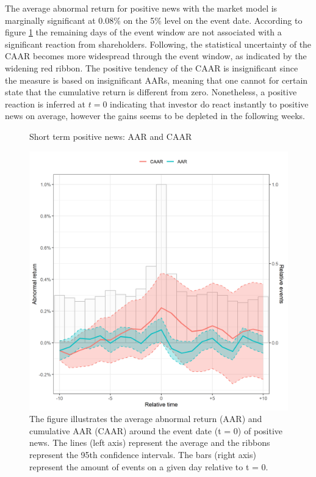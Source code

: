 The average abnormal return for positive news with the market model is marginally significant at 0.08\% on the 5\% level on the event date. According to figure \ref{fig:ST_pos_news} the remaining days of the event window are not associated with a significant reaction from shareholders. Following, the statistical uncertainty of the CAAR becomes more widespread through the event window, as indicated by the widening red ribbon. The positive tendency of the CAAR is insignificant since the measure is based on insignificant AARs, meaning that one cannot for certain state that the cumulative return is different from zero. Nonetheless, a positive reaction is inferred at $t=0$ indicating that investor do react instantly to positive news on average, however the gains seems to be depleted in the following weeks.  

\begin{figure} [H] 
    \centering
    \caption{Short term positive news: AAR and CAAR}
    \includegraphics[scale=0.6]{Projekt/1.Figures analysis/ST_positive_all_CI.png}
    \caption*{\footnotesize The figure illustrates the average abnormal return (AAR) and cumulative AAR (CAAR) around the event date (t = 0) of positive news. The lines (left axis) represent the average and the ribbons represent the 95th confidence intervals. The bars (right axis) represent the amount of events on a given day relative to t = 0. }
    \label{fig:ST_pos_news}
\end{figure}

